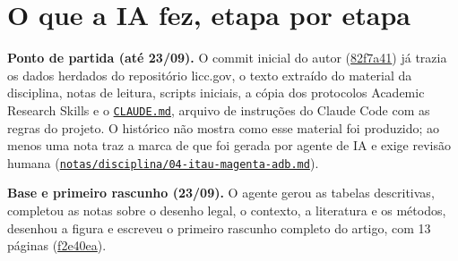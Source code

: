 \documentclass[12pt,a4paper]{article}
\begin{document}
\section{O que a IA fez, etapa por etapa}\label{secao-4}

\textbf{Ponto de partida (até 23/09).} O commit inicial do autor
(\href{https://github.com/fcarva/aval-pol/commit/82f7a41ce688ab6cc189c2df738e162078614635}{82f7a41})
já trazia os dados herdados do repositório licc.gov, o texto extraído do material da disciplina,
notas de leitura, scripts iniciais, a cópia dos protocolos Academic Research Skills e o
\href{https://github.com/fcarva/aval-pol/blob/50cc9b02b42b52205f650eb6053f63a078e6a387/CLAUDE.md}{\nolinkurl{CLAUDE.md}},
arquivo de instruções do Claude Code com as regras do projeto. O histórico não mostra como esse
material foi produzido; ao menos uma nota traz a marca de que foi gerada por agente de IA e exige
revisão humana
(\href{https://github.com/fcarva/aval-pol/blob/50cc9b02b42b52205f650eb6053f63a078e6a387/notas/disciplina/04-itau-magenta-adb.md}{\nolinkurl{notas/disciplina/04-itau-magenta-adb.md}}).

\textbf{Base e primeiro rascunho (23/09).} O agente gerou as tabelas descritivas, completou as notas
sobre o desenho legal, o contexto, a literatura e os métodos, desenhou a figura e escreveu o
primeiro rascunho completo do artigo, com 13 páginas
(\href{https://github.com/fcarva/aval-pol/commit/f2e40ea756de0e27a524d28d8f6031e98200ea8a}{f2e40ea}).
\end{document}

